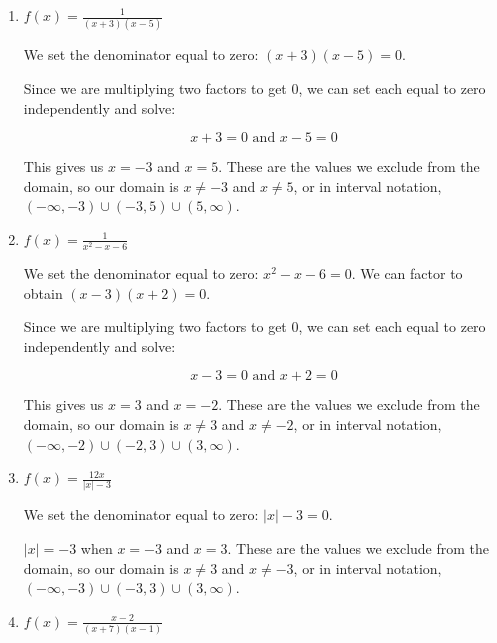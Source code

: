 \documentclass{ximera}
\begin{document}
\begin{enumerate}
	\item $f(x) = \frac{1}{(x + 3)(x - 5)}$
		\begin{explanation}
			\begin{expandable}

We set the denominator equal to zero: $(x + 3)(x - 5) = 0$. 

Since we are multiplying two factors to get 0, we can set each equal to zero independently and solve: 

$$x + 3 = 0 \text{ and } x - 5 = 0$$

This gives us $x = -3$ and $x = 5$. These are the values we exclude from the domain, so our domain is $x \ne -3$ and $x \ne 5$, or in interval notation, $(-\infty, -3) \cup (-3, 5) \cup (5, \infty)$.
			\end{expandable} 
		\end{explanation}
	\item $f(x) = \frac{1}{x^2 - x - 6}$
		\begin{explanation}
			\begin{expandable}

We set the denominator equal to zero: $x^2 - x - 6 = 0$. We can factor to obtain $(x - 3)(x + 2) = 0$. 

Since we are multiplying two factors to get 0, we can set each equal to zero independently and solve: 

$$x - 3 = 0 \text{ and } x + 2 = 0$$

This gives us $x = 3$ and $x = -2$. These are the values we exclude from the domain, so our domain is $x \ne 3$ and $x \ne -2$, or in interval notation, $(-\infty, -2) \cup (-2, 3) \cup (3, \infty)$. 
			\end{expandable}
		\end{explanation}
	\item $f(x) = \frac{12x}{|x| - 3}$
		\begin{explanation}
			\begin{expandable}

We set the denominator equal to zero: $|x| - 3 = 0$.

$|x| = -3$ when $x = -3$ and $x = 3$. These are the values we exclude from the domain, so our domain is $x \ne 3$ and $x \ne -3$, or in interval notation, $(-\infty, -3) \cup (-3, 3) \cup (3, \infty)$. 
			\end{expandable}
		\end{explanation}
	\item $f(x) = \frac{x - 2}{(x + 7)(x - 1)}$
		\begin{explanation}
			\begin{expandable}


\end{expandable}
\end{explanation}
\end{enumerate}
\end{document}

